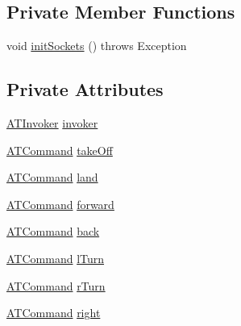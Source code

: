 \subsection*{Private Member Functions}
\begin{DoxyCompactItemize}
\item 
void \hyperlink{class_drone_1_1_drone_commands_1_1_a_t___command___manager_a415bb69cbea629bf575c74eae45f11ac}{init\+Sockets} ()  throws Exception 	
\end{DoxyCompactItemize}
\subsection*{Private Attributes}
\begin{DoxyCompactItemize}
\item 
\hyperlink{class_drone_1_1_drone_commands_1_1_a_t_invoker}{A\+T\+Invoker} \hyperlink{class_drone_1_1_drone_commands_1_1_a_t___command___manager_a642a1ab26cb9c2df925c2a62d9c15d44}{invoker}
\item 
\hyperlink{interface_drone_1_1_drone_commands_1_1_a_t_command}{A\+T\+Command} \hyperlink{class_drone_1_1_drone_commands_1_1_a_t___command___manager_a43638f032e3994903cdabd2ca611448b}{take\+Off}
\item 
\hyperlink{interface_drone_1_1_drone_commands_1_1_a_t_command}{A\+T\+Command} \hyperlink{class_drone_1_1_drone_commands_1_1_a_t___command___manager_ada478bc35e402b7568d776616813c3a6}{land}
\item 
\hyperlink{interface_drone_1_1_drone_commands_1_1_a_t_command}{A\+T\+Command} \hyperlink{class_drone_1_1_drone_commands_1_1_a_t___command___manager_a73bf7a9109943dceafd6ca5c7d99d47c}{forward}
\item 
\hyperlink{interface_drone_1_1_drone_commands_1_1_a_t_command}{A\+T\+Command} \hyperlink{class_drone_1_1_drone_commands_1_1_a_t___command___manager_a6a61163ab15381d542794a87a7045be8}{back}
\item 
\hyperlink{interface_drone_1_1_drone_commands_1_1_a_t_command}{A\+T\+Command} \hyperlink{class_drone_1_1_drone_commands_1_1_a_t___command___manager_ad5d87d1abcf6a08d4cd69a2bab032588}{l\+Turn}
\item 
\hyperlink{interface_drone_1_1_drone_commands_1_1_a_t_command}{A\+T\+Command} \hyperlink{class_drone_1_1_drone_commands_1_1_a_t___command___manager_a8519565580d2a2e1eabd91f236452ca2}{r\+Turn}
\item 
\hyperlink{interface_drone_1_1_drone_commands_1_1_a_t_command}{A\+T\+Command} \hyperlink{class_drone_1_1_drone_commands_1_1_a_t___command___manager_a9a8b81e3c9702e2eb996283f1e441c9a}{right}

\end{DoxyCompactItemize}
